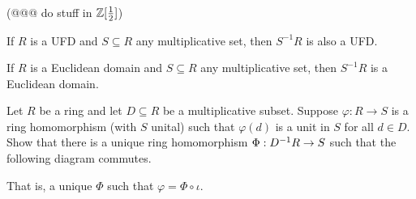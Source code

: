 \begin{exercise}
(@@@ do stuff in \(\ZZ[\frac{1}{2}]\))
\end{exercise}


\begin{exercise}
If \(R\) is a UFD and \(S \subseteq R\) any multiplicative set, then \(S^{-1}R\) is also a UFD.
\end{exercise}


\begin{exercise}
If \(R\) is a Euclidean domain and \(S \subseteq R\) any multiplicative set, then \(S^{-1}R\) is a Euclidean domain.
\end{exercise}


\begin{exercise}
Let \(R\) be a ring and let \(D \subseteq R\) be a multiplicative subset.
Suppose \(\varphi : R \rightarrow S\) is a ring homomorphism (with \(S\) unital) such that \(\varphi(d)\) is a unit in \(S\) for all \(d \in D\).
Show that there is a unique ring homomorphism \(\Phi : \LOCALIZE{R}{D} \rightarrow S\) such that the following diagram commutes.
\begin{center}
\end{center}
That is, a unique \(\Phi\) such that \(\varphi = \Phi \circ \iota\).
\end{exercise}
